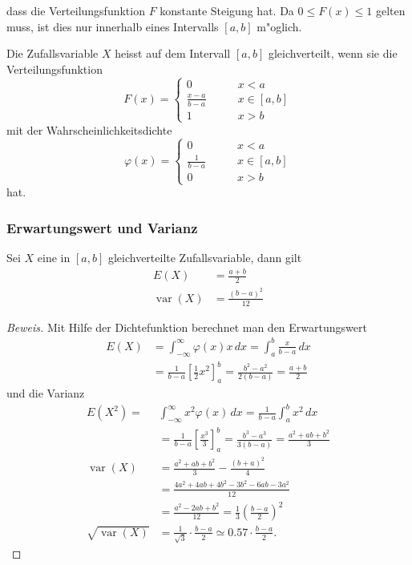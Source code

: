 dass die Verteilungsfunktion $F$ konstante Steigung hat. Da $0\le F(x)\le 1$
gelten muss, ist dies nur innerhalb eines Intervalls $[a,b]$ m"oglich.
\begin{definition}Die Zufallsvariable $X$ heisst auf dem Intervall
$[a,b]$ gleichverteilt, wenn sie die Verteilungsfunktion
\[
F(x)=\begin{cases}
0&\qquad x< a\\
\displaystyle \frac{x-a}{b-a}&\qquad x\in[a,b]\\
1&\qquad x> b
\end{cases}
\]
mit der Wahrscheinlichkeitsdichte
\[
\varphi(x)=\begin{cases}
0&\qquad x< a\\
\displaystyle \frac1{b-a}&\qquad x\in[a,b]\\
0&\qquad x> b
\end{cases}
\]
hat.
\end{definition}

\subsubsection{Erwartungswert und Varianz}
\begin{satz}Sei $X$ eine in $[a,b]$ gleichverteilte Zufallsvariable,
dann gilt
\begin{align*}
E(X)&=\frac{a+b}2\\
\operatorname{var}(X)&=\frac{(b-a)^2}{12}
\end{align*}
\end{satz}
\begin{proof}[Beweis]
Mit Hilfe der Dichtefunktion berechnet man den Erwartungswert
\begin{align*}
E(X)&=\int_{-\infty}^\infty \varphi(x)x\,dx=\int_a^b\frac{x}{b-a}\,dx\\
&=\frac1{b-a}\left[\frac12x^2\right]_a^b=\frac{b^2-a^2}{2(b-a)}=\frac{a+b}2
\end{align*}
und die Varianz
\begin{align*}
E(X^2)=&\int_{-\infty}^\infty x^2\varphi(x)\,dx=\frac1{b-a}\int_a^bx^2\,dx\\
&=\frac1{b-a}\left[\frac{x^3}3\right]_a^b=\frac{b^3-a^3}{3(b-a)}=\frac{a^2+ab+b^2}3\\
\operatorname{var}(X)&=\frac{a^2+ab+b^2}3-\frac{(b+a)^2}4\\
&=\frac{4a^2+4ab+4b^2-3b^2-6ab-3a^2}{12}\\
&=\frac{a^2-2ab+b^2}{12}=\frac13\left(\frac{b-a}2\right)^2\\
\sqrt{\operatorname{var}(X)}&=\frac1{\sqrt{3}}\cdot\frac{b-a}2\simeq 0.57\cdot\frac{b-a}2.
\end{align*}

\end{proof}


